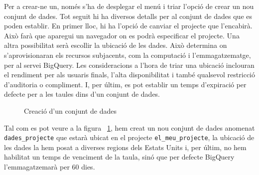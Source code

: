 \documentclass[12pt,longbibliography]{article}
\theoremstyle{definition}
\theoremstyle{remark}
\begin{document}
\vspace{2mm}

Per a crear-ne un, només s'ha de desplegar el menú i triar l'opció de crear un nou conjunt de dades. Tot seguit hi ha diversos detalls per al conjunt de dades que es poden establir. En primer lloc, hi ha l'opció de canviar el projecte que l'encabirà. Això farà que aparegui un navegador on es podrà especificar el projecte. Una altra possibilitat serà escollir la ubicació de les dades. Això determina on s'aprovisionaran els recursos subjacents, com la computació i l'emmagatzematge, per al servei BigQuery. Les consideracions a l'hora de triar una ubicació inclouran el rendiment per als usuaris finals, l'alta disponibilitat i també qualsevol restricció d'auditoria o compliment. I, per últim, es pot establir un temps d'expiració per defecte per a les taules dins d'un conjunt de dades.

\vspace{2mm}
\begin{figure}[h!]
\par
{}%
\hfill
{}%
\par
\caption{Creació d'un conjunt de dades}
\label{fig:bq3}
\end{figure}
\vspace{2mm}

Tal com es pot veure a la figura ~\ref{fig:bq3}, hem creat un nou conjunt de dades anomenat \verb|dades_projecte| que estarà ubicat en el projecte \verb|el_meu_projecte|, la ubicació de les dades la hem posat a diverses regions dels Estats Units i, per últim, no hem habilitat un temps de venciment de la taula, sinó que per defecte BigQuery l'emmagatzemarà per 60 dies.
\end{document}
